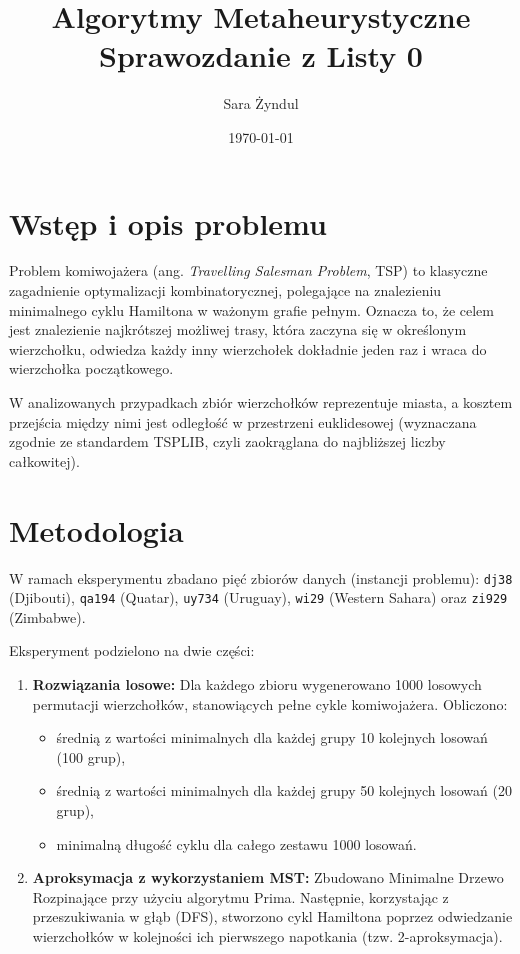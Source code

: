 \documentclass[12pt,a4paper]{article}
\title{Algorytmy Metaheurystyczne\\ Sprawozdanie z Listy 0}
\author{Sara Żyndul}
\date{\today}
\begin{document}
\maketitle

\section{Wstęp i opis problemu}
Problem komiwojażera (ang. \textit{Travelling Salesman Problem}, TSP) to klasyczne zagadnienie optymalizacji kombinatorycznej, polegające na znalezieniu minimalnego cyklu Hamiltona w ważonym grafie pełnym. Oznacza to, że celem jest znalezienie najkrótszej możliwej trasy, która zaczyna się w określonym wierzchołku, odwiedza każdy inny wierzchołek dokładnie jeden raz i wraca do wierzchołka początkowego.

W analizowanych przypadkach zbiór wierzchołków reprezentuje miasta, a kosztem przejścia między nimi jest odległość w przestrzeni euklidesowej (wyznaczana zgodnie ze standardem TSPLIB, czyli zaokrąglana do najbliższej liczby całkowitej). 


\section{Metodologia}
W ramach eksperymentu zbadano pięć zbiorów danych (instancji problemu): \texttt{dj38} (Djibouti), \texttt{qa194} (Quatar), \texttt{uy734} (Uruguay), \texttt{wi29} (Western Sahara) oraz \texttt{zi929} (Zimbabwe).

Eksperyment podzielono na dwie części:
\begin{enumerate}
    \item \textbf{Rozwiązania losowe:} Dla każdego zbioru wygenerowano 1000 losowych permutacji wierzchołków, stanowiących pełne cykle komiwojażera. Obliczono:
    \begin{itemize}
        \item średnią z wartości minimalnych dla każdej grupy 10 kolejnych losowań (100 grup),
        \item średnią z wartości minimalnych dla każdej grupy 50 kolejnych losowań (20 grup),
        \item minimalną długość cyklu dla całego zestawu 1000 losowań.
    \end{itemize}
    \item \textbf{Aproksymacja z wykorzystaniem MST:} Zbudowano Minimalne Drzewo Rozpinające przy użyciu algorytmu Prima. Następnie, korzystając z przeszukiwania w głąb (DFS), stworzono cykl Hamiltona poprzez odwiedzanie wierzchołków w kolejności ich pierwszego napotkania (tzw. 2-aproksymacja).
\end{enumerate}
\end{document}
